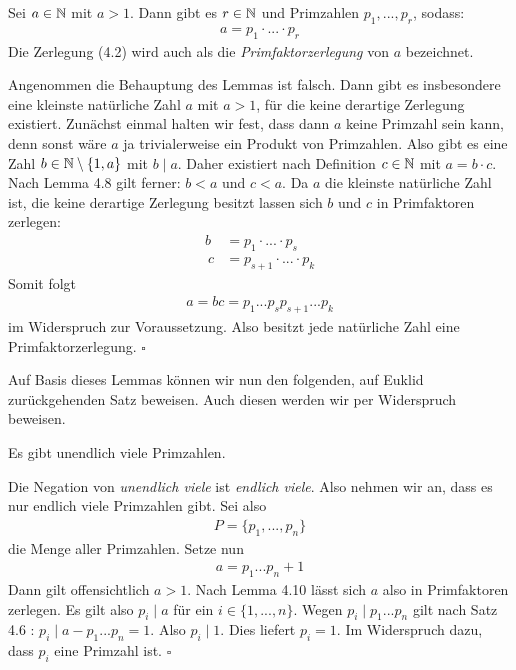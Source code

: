 \begin{lemma}
Sei $a \in \mathbb{N}$ mit $a > 1$.
Dann gibt es $r \in \mathbb{N}$ und Primzahlen $p_1,...,p_r$, sodass:
\begin{align}
    a = p_1 \cdot ... \cdot p_r
\end{align}
Die Zerlegung (4.2) wird auch als die \textit{Primfaktorzerlegung} von $a$
bezeichnet.
\end{lemma}

\begin{proof*}%
Angenommen die Behauptung des Lemmas ist falsch.
Dann gibt es insbesondere eine kleinste natürliche Zahl $a$ mit $a>1$,
für die keine derartige Zerlegung existiert.
Zunächst einmal halten wir fest, dass dann $a$ keine Primzahl sein kann,
denn sonst wäre $a$ ja trivialerweise ein Produkt von Primzahlen.
Also gibt es eine Zahl $b \in \mathbb{N} \setminus \{1,a\}$ mit $b \mid a$.
Daher existiert nach Definition $c \in \mathbb{N}$ mit $a = b \cdot c$.
Nach Lemma 4.8 gilt ferner:
$b < a$ und $c < a$. Da $a$ die kleinste natürliche Zahl ist, die keine
derartige Zerlegung besitzt lassen sich $b$ und $c$ in Primfaktoren zerlegen:
\begin{align*}
    b &= p_1 \cdot ... \cdot p_s \\\
    c &= p_{s+1} \cdot ... \cdot p_k
\end{align*}
Somit folgt
\begin{align*}
    a = b c = p_1 ... p_s p_{s+1} ... p_k
\end{align*}
im Widerspruch zur Voraussetzung.
Also besitzt jede natürliche Zahl eine Primfaktorzerlegung.
\hfill $\square$
\end{proof*}

Auf Basis dieses Lemmas können wir nun den folgenden, auf Euklid
zurückgehenden Satz beweisen.
Auch diesen werden wir per Widerspruch beweisen.

\begin{theorem}
Es gibt unendlich viele Primzahlen.
\end{theorem}

\begin{proof*}
Die Negation von \textit{unendlich viele} ist \textit{endlich viele}.
Also nehmen wir an, dass es nur endlich viele Primzahlen gibt.
Sei also
\begin{align*}
    P = \{p_1,...,p_n\}
\end{align*}
die Menge aller Primzahlen.
Setze nun
\begin{align*}
    a = p_1 ... p_n + 1
\end{align*}
Dann gilt offensichtlich $a>1$.
Nach Lemma 4.10 lässt sich $a$ also in Primfaktoren zerlegen.
Es gilt also $p_i \mid a$ für ein $i \in \{1,...,n\}$.
Wegen $p_i \mid p_1 ... p_n$ gilt nach Satz 4.6 : $p_i \mid a - p_1 ... p_n = 1$.
Also $p_i \mid 1$.
Dies liefert $p_i = 1$. Im Widerspruch dazu, dass $p_i$ eine Primzahl ist.
\hfill $\square$
\end{proof*}

